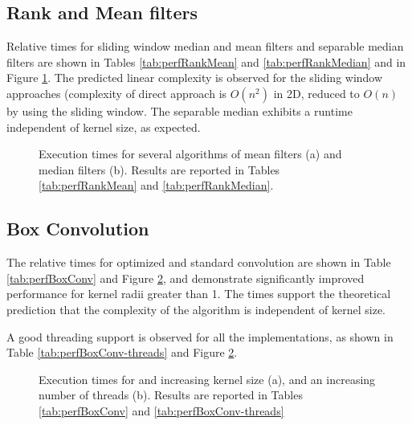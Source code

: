 \documentclass{InsightArticle}
\begin{document}
\subsection{Rank and Mean filters}
Relative times for sliding window median and mean filters and
separable median filters are shown in Tables \ref{tab:perfRankMean}
and \ref{tab:perfRankMedian} and in Figure \ref{fig:perfRank}. The
predicted linear complexity is observed for the sliding window
approaches (complexity of direct approach is $O(n^2)$ in 2D, reduced
to $O(n)$ by using the sliding window. The separable median exhibits a
runtime independent of kernel size, as expected.

\begin{figure}[htbp]
\begin{center}
\caption{Execution times for several algorithms of mean filters (a) and
median filters (b).\label{fig:perfRank}
Results are reported in Tables \ref{tab:perfRankMean} and  \ref{tab:perfRankMedian}.}
\end{center}
\end{figure}


\subsection{Box Convolution}
The relative times for optimized and standard convolution are shown in
Table \ref{tab:perfBoxConv} and Figure \ref{fig:perfBoxConv}, and demonstrate significantly improved
performance for kernel radii greater than 1. The times support the
theoretical prediction that the complexity of the algorithm is
independent of kernel size.

A good threading support is observed for all the implementations, as shown in Table
\ref{tab:perfBoxConv-threads} and Figure \ref{fig:perfBoxConv}.


\begin{figure}[htbp]
\begin{center}
\caption{Execution times for and increasing kernel size (a), and an increasing number of threads (b).
\label{fig:perfBoxConv}
Results are reported in Tables \ref{tab:perfBoxConv} and  \ref{tab:perfBoxConv-threads}}
\end{center}
\end{figure}
\end{document}

